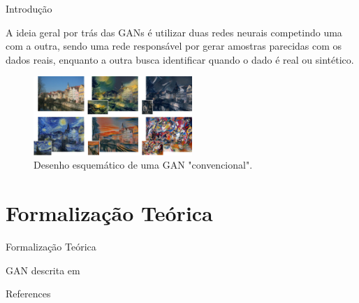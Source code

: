 \documentclass[10pt]{beamer}
\begin{document}
\begin{frame}[fragile]{Introdução}

	A ideia geral por trás das GANs é utilizar duas redes neurais
	competindo uma com a outra, sendo uma rede responsável por
	gerar amostras parecidas com os dados reais, enquanto a outra
	busca identificar quando o dado é real ou sintético.

    \begin{figure}[H]
        \centering
        \includegraphics[width=6cm]{images/style-transfer.jpeg}
        \caption{Desenho esquemático de uma GAN "convencional".}
    \end{figure}


\end{frame}


\AtBeginSection{}
\section[Teoria]{Formalização Teórica}
\begin{frame}[fragile]{Formalização Teórica}

  \footnotesize
  \begin{algorithm}[H]
  \SetAlgoLined
   \caption{GAN descrita em \citet{goodfellow2014}}
  \end{algorithm}

\end{frame}

\begin{frame}[allowframebreaks]{References}

  \renewcommand{\section}[2]{}%
  
  

\end{frame}
\end{document}
